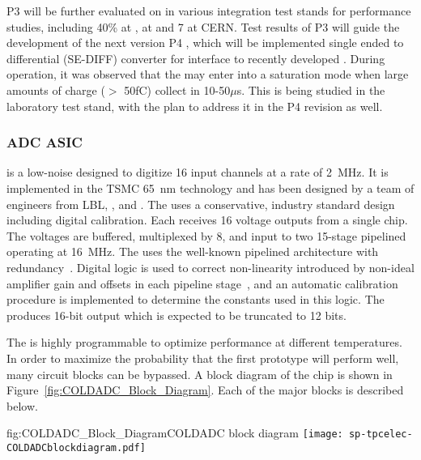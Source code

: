 P3   will be further evaluated on  in various integration test stands for performance studies, including 40\%  at ,   at  and 7 at CERN. Test results of P3   will guide the development of the next version P4  , which will be implemented single ended to differential (SE-DIFF) converter for interface to recently developed  . During  operation, it was observed that the   may enter into a saturation mode when large amounts of charge ($>$ 50fC) collect in 10-50$\mu$s. This is being studied in the laboratory test stand, with the plan to address it in the P4   revision as well.

\subsubsection{ADC ASIC}
\label{sec:fdsp-tpcelec-design-femb-adc}

 is a low-noise   designed to digitize
16 input channels at a rate of \SI{2}{MHz}. It is implemented in the TSMC
\SI{65}{nm}  technology and has been designed by a team of engineers
from LBL, , and .  The  uses a conservative,
industry standard design including digital calibration.  Each 
receives 16 voltage outputs from a single  chip.  The voltages
are buffered, multiplexed by 8, and input to two 15-stage pipelined 
operating at \SI{16}{MHz}.  The  uses the well-known pipelined architecture
with redundancy~\cite{PipelinedADC}.  Digital logic is used to correct non-linearity
introduced by non-ideal amplifier gain and offsets in each pipeline
stage~\cite{CalibrationCorrection}, and an automatic calibration procedure is
implemented to determine the constants used in this logic.  The  produces
16-bit output which is expected to be truncated to 12 bits.

The  is highly programmable to optimize performance at different
temperatures.  In order to maximize the probability that the first prototype
 will perform well, many circuit blocks can be bypassed.  A block
diagram of the chip is shown in Figure~\ref{fig:COLDADC_Block_Diagram}.  Each of
the major blocks is described below.

\begin{dunefigure}{fig:COLDADC_Block_Diagram}{COLDADC block diagram}
\texttt{[image: sp-tpcelec-COLDADCblockdiagram.pdf]}
\end{dunefigure}

